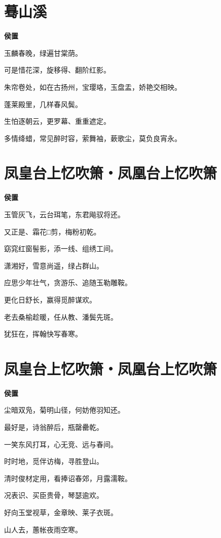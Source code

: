 \documentclass[12pt,a4paper]{ctexbook}
\begin{document}
\section{蓦山溪}
\textbf{侯置}\par\vspace{0.5em}
玉麟春晚，绿遍甘棠荫。\par
可是惜花深，旋移得、翻阶红影。\par
朱帘卷处，如在古扬州，宝璎珞，玉盘盂，娇艳交相映。\par
蓬莱殿里，几样春风鬓。\par
生怕逐朝云，更罗幕、重重遮定。\par
多情绛蜡，常见醉时容，萦舞袖，蔌歌尘，莫负良宵永。\par

\section{凤皇台上忆吹箫・凤凰台上忆吹箫}
\textbf{侯置}\par\vspace{0.5em}
玉管灰飞，云台珥笔，东君飚驭将还。\par
又正是、霜花□剪，梅粉初乾。\par
窈窕红窗髻影，添一线、组绣工间。\par
潇湘好，雪意尚遥，绿占群山。\par
应思少年壮气，贪游乐、追随玉勒雕鞍。\par
更化日舒长，赢得觅醉谋欢。\par
老去桑榆趁暖，任从教、潘鬓先斑。\par
犹狂在，挥翰快写春寒。\par

\section{凤皇台上忆吹箫・凤凰台上忆吹箫}
\textbf{侯置}\par\vspace{0.5em}
尘暗双凫，菊明山径，何妨倦羽知还。\par
最好是，诗翁醉后，瓶罄罍乾。\par
一笑东风打耳，心无竞、远与春间。\par
时时地，觅伴访梅，寻胜登山。\par
清时俊材定用，看捧诏春郊，月露濡鞍。\par
况表识、买臣贵骨，琴瑟逾欢。\par
好向玉堂视草，金章映、莱子衣斑。\par
山人去，蕙帐夜雨空寒。\par
\end{document}
